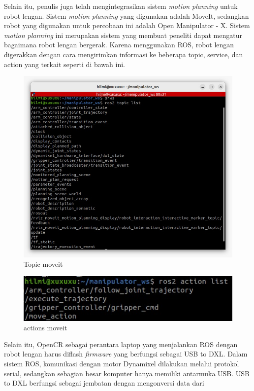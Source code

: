 Selain itu, penulis juga telah mengintegrasikan sistem \emph{motion planning} untuk robot lengan. Sistem \emph{motion planning} yang digunakan adalah MoveIt,
sedangkan robot yang digunakan untuk percobaan ini adalah Open Manipulator - X. Sistem \emph{motion planning} ini merupakan sistem yang membuat
peneliti dapat mengatur bagaimana robot lengan bergerak. Karena menggunakan ROS, robot lengan digerakkan dengan cara mengirimkan informasi
ke beberapa topic, service, dan action yang terkait seperti di bawah ini.
\begin{figure} [H] \centering
    \includegraphics[scale=0.3]{gambar/moveit topic.jpeg}
    \caption{Topic moveit}
    \label{fig:moveit_topic}
  \end{figure}
\begin{figure} [H] \centering
    \includegraphics[scale=0.4]{gambar/moveit actions.jpeg}
    \caption{actions moveit}
    \label{fig:moveit_actions}
\end{figure}
Selain itu, OpenCR sebagai perantara laptop yang menjalankan ROS dengan robot lengan harus diflash \emph{firmware} yang berfungsi sebagai
USB to DXL. Dalam sistem ROS, komunikasi dengan motor Dynamixel dilakukan melalui protokol serial,
sedangkan sebagian besar komputer hanya memiliki antarmuka USB. USB to DXL berfungsi sebagai jembatan dengan mengonversi data dari
